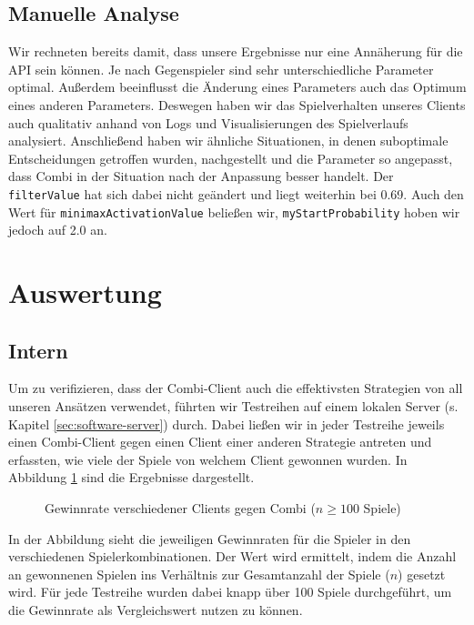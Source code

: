 \documentclass[12pt,a4paper]{article}
\begin{document}
\subsection{Manuelle Analyse}
Wir rechneten bereits damit, dass unsere Ergebnisse nur eine Annäherung für die API sein können. Je nach Gegenspieler sind sehr unterschiedliche Parameter optimal. Außerdem beeinflusst die Änderung eines Parameters auch das Optimum eines anderen Parameters. Deswegen haben wir das Spielverhalten unseres Clients auch qualitativ anhand von Logs und Visualisierungen des Spielverlaufs analysiert. Anschließend haben wir ähnliche Situationen, in denen suboptimale Entscheidungen getroffen wurden, nachgestellt und die Parameter so angepasst, dass Combi in der Situation nach der Anpassung besser handelt. Der \texttt{filterValue} hat sich dabei nicht geändert und liegt weiterhin bei 0.69. Auch den Wert für \texttt{minimaxActivationValue} beließen wir, \texttt{myStartProbability} hoben wir jedoch auf 2.0 an.

\section{Auswertung}

\subsection{Intern}\label{sec:interne-evaluation}

Um zu verifizieren, dass der Combi-Client auch die effektivsten Strategien von all unseren Ansätzen verwendet, führten wir Testreihen auf einem lokalen Server (s. Kapitel \ref{sec:software-server}) durch. Dabei ließen wir in jeder Testreihe jeweils einen Combi-Client gegen einen Client einer anderen Strategie antreten und erfassten, wie viele der Spiele von welchem Client gewonnen wurden. In Abbildung \ref{fig:internal-testing} sind die Ergebnisse dargestellt.

\begin{figure}[h!]
    \centering
    
    \caption{Gewinnrate verschiedener Clients gegen Combi ($n \geq 100$ Spiele)}
    \label{fig:internal-testing}
\end{figure}

In der Abbildung sieht die jeweiligen Gewinnraten für die Spieler in den verschiedenen Spielerkombinationen. Der Wert wird ermittelt, indem die Anzahl an gewonnenen Spielen ins Verhältnis zur Gesamtanzahl der Spiele ($n$) gesetzt wird. Für jede Testreihe wurden dabei knapp über 100 Spiele durchgeführt, um die Gewinnrate als Vergleichswert nutzen zu können.
\end{document}
